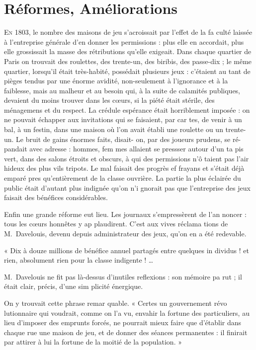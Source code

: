 \chapter{Réformes, Améliorations}

\lettrine{E}{n} 1803, le nombre des maisons de
jeu s'acroissait par l'effet de la fa%
culté laissée à l'entreprise générale
d'en donner les permissions : plus elle
en accordait, plus elle grossissait la
masse des rétributions qu'elle exigeait.
Dans chaque quartier de Paris on
trouvait des roulettes, des trente-un,
des biribis, des passe-dix ; le même
quartier, lorsqu'il était très-habité,
possédait plusieurs jeux : c'étaient au%
tant de pièges tendus par une énorme
avidité, non-seulement à l'ignorance
et à la faiblesse, mais au malheur et
au besoin qui, à la suite de calamités
publiques, devaient du moins trouver
dans les c{\oe}urs, si la piété était stérile,
des ménagemens et du respect. La
crédule espérance était horriblement
imposée : on ne pouvait échapper aux
invitations qui se faisaient, par car%
tes, de venir à un bal, à un festin,
dans une maison où l'on avait établi
une roulette ou un trente-un. Le
bruit de gains énormes faits, disait-%
on, par des joueurs prudens, se ré-%
pandait avec adresse : hommes, fem%
mes allaient se pressser autour d'un ta%
pis vert, dans des salons étroits et
obscurs, à qui des permissions n'ô%
taient pas l'air hideux des plus vils
tripots. Le mal faisait des progrès ef%
frayans et s'était déjà emparé pres%
qu'entièrement de la classe ouvrière.
La partie la plus éclairée du public
était d'autant plus indignée qu'on n'i%
gnorait pas que l'entreprise des jeux
faisait des bénéfices considérables.

Enfin une grande réforme eut lieu.
Les journaux s'empressèrent de l'an%
noncer : tous les c{\oe}urs honnêtes y ap%
plaudirent. C'est aux vives réclama%
tions de M.~Davelouis, devenu depuis
administrateur des jeux, qu'on en a 
été redevable.

« Dix à douze millions de bénéfice
annuel partagés entre quelques in%
dividus ! et rien, absolument rien pour
la classe indigente ! \ldots

M.~Davelouis ne fit pas là-dessus
d'inutiles reflexions : son mémoire pa%
rut ; il était clair, précis, d'une sim%
plicité énergique.

On y trouvait cette phrase remar%
quable.
« Certes un gouvernement révo%
lutionnaire qui voudrait, comme
on l'a vu, envahir la fortune des
particuliers, au lieu d'imposer des
emprunts forcés, ne pourrait mieux
faire que d'établir dans chaque rue
une maison de jeu, et de donner
des séances permanentes : il finirait
par attirer à lui la fortune de la
moitié de la population. »

